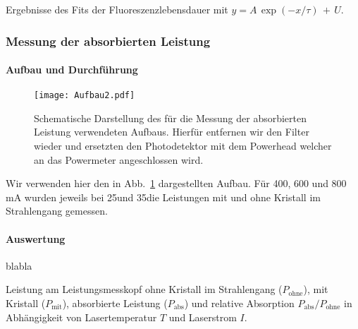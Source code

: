 \begin{table}[htb]
\caption{Ergebnisse des Fits der Fluoreszenzlebensdauer mit
$y=A\,\exp(-x/\tau)\,+\,U$.}

\label{tab:Fit_lifetime}
\end{table}


\subsubsection{Messung der absorbierten Leistung}

\paragraph{Aufbau und Durchführung}

\begin{figure}[H]
\begin{center}
  \texttt{[image: Aufbau2.pdf]}
  \caption{Schematische Darstellung des für die Messung der absorbierten Leistung verwendeten Aufbaus. Hierfür entfernen wir den Filter wieder und ersetzten den Photodetektor mit dem Powerhead welcher an das Powermeter angeschlossen wird.}
  \label{img:aufbau2}
\end{center}
\end{figure}

Wir verwenden hier den in Abb.~\ref{img:aufbau2} dargestellten Aufbau. Für 400, 600 und 800\,mA wurden jeweils bei 25\grad und 35\grad die Leistungen mit und ohne Kristall im Strahlengang gemessen.



\paragraph{Auswertung}
blabla
 
\begin{table}[htb]
\caption{Leistung am Leistungsmesskopf ohne Kristall im Strahlengang ($P_\text{ohne}$),
mit Kristall ($P_\text{mit}$), absorbierte Leistung ($P_\text{abs}$) und relative Absorption
$P_\text{abs}/P_\text{ohne}$ in Abhängigkeit von Lasertemperatur $T$ und Laserstrom $I$.}

\label{tab:Absorption}
\end{table}

